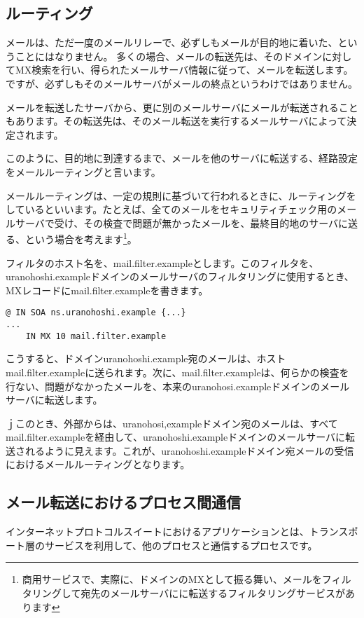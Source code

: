 \subsection{ルーティング}

メールは、ただ一度のメールリレーで、必ずしもメールが目的地に着いた、ということにはなりません。
多くの場合、メールの転送先は、そのドメインに対してMX検索を行い、得られたメールサーバ情報に従って、メールを転送します。ですが、必ずしもそのメールサーバがメールの終点というわけではありません。

メールを転送したサーバから、更に別のメールサーバにメールが転送されることもあります。その転送先は、そのメール転送を実行するメールサーバによって決定されます。

このように、目的地に到達するまで、メールを他のサーバに転送する、経路設定をメールルーティングと言います。

メールルーティングは、一定の規則に基づいて行われるときに、ルーティングをしているといいます。たとえば、全てのメールをセキュリティチェック用のメールサーバで受け、その検査で問題が無かったメールを、最終目的地のサーバに送る、という場合を考えます\footnote{商用サービスで、実際に、ドメインのMXとして振る舞い、メールをフィルタリングして宛先のメールサーバにに転送するフィルタリングサービスがあります}。

フィルタのホスト名を、mail.filter.exampleとします。このフィルタを、uranohoshi.exampleドメインのメールサーバのフィルタリングに使用するとき、MXレコードにmail.filter.exampleを書きます。

\begin{verbatim}
@ IN SOA ns.uranohoshi.example {...}
...
    IN MX 10 mail.filter.example
\end{verbatim}

こうすると、ドメインuranohoshi.example宛のメールは、ホストmail.filter.exampleに送られます。次に、mail.filter.exampleは、何らかの検査を行ない、問題がなかったメールを、本来のuranohosi.exampleドメインのメールサーバに転送します。

ｊこのとき、外部からは、uranohosi,exampleドメイン宛のメールは、すべてmail.filter.exampleを経由して、uranohoshi.exampleドメインのメールサーバに転送されるように見えます。これが、uranohoshi.exampleドメイン宛メールの受信におけるメールルーティングとなります。


\subsection{メール転送におけるプロセス間通信}

インターネットプロトコルスイートにおけるアプリケーションとは、トランスポート層のサービスを利用して、他のプロセスと通信するプロセスです。

